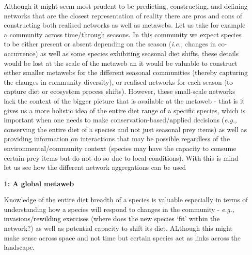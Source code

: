 \documentclass[
]{article}
\begin{document}
\begin{tcolorbox}[enhanced jigsaw, toptitle=1mm, bottomrule=.15mm, arc=.35mm, opacityback=0, colback=white, colbacktitle=quarto-callout-note-color!10!white, breakable, coltitle=black, opacitybacktitle=0.6, toprule=.15mm, leftrule=.75mm, bottomtitle=1mm, titlerule=0mm, title=\textcolor{quarto-callout-note-color}{\faInfo}\hspace{0.5em}{Box 1 - Why we need to aggregate networks at different scales: A
hypothetical case study}, colframe=quarto-callout-note-color-frame, left=2mm, rightrule=.15mm]

Although it might seem most prudent to be predicting, constructing, and
defining networks that are the closest representation of reality there
are pros and cons of constructing both realised networks as well as
metawebs. Let us take for example a community across time/through
seasons. In this community we expect species to be either present or
absent depending on the season (\emph{i.e.,} changes in co-occurrence)
as well as some species exhibiting seasonal diet shifts, these details
would be lost at the scale of the metaweb an it would be valuable to
construct either smaller metawebs for the different seasonal communities
(thereby capturing the changes in community diversity), or realised
networks for each season (to capture diet or ecosystem process shifts).
However, these small-scale networks lack the context of the bigger
picture that is available at the metaweb - that is it gives us a more
holistic idea of the entire diet range of a specific species, which is
important when one needs to make conservation-based/applied decisions
(\emph{e.g.,} conserving the entire diet of a species and not just
seasonal prey items) as well as providing information on interactions
that may be possible regardless of the environmental/community context
(species may have the capacity to consume certain prey items but do not
do so due to local conditions). With this is mind let us see how the
different network aggregations can be used

\textbf{1: A global metaweb}

Knowledge of the entire diet breadth of a species is valuable especially
in terms of understanding how a species will respond to changes in the
community - \emph{e.g.,} invasions/rewilding exercises (where does the
new species `fit' within the network?) as well as potential capacity to
shift its diet. ALthough this might make sense across space and not time
but certain species act as links across the landscape.


\end{tcolorbox}
\end{document}
